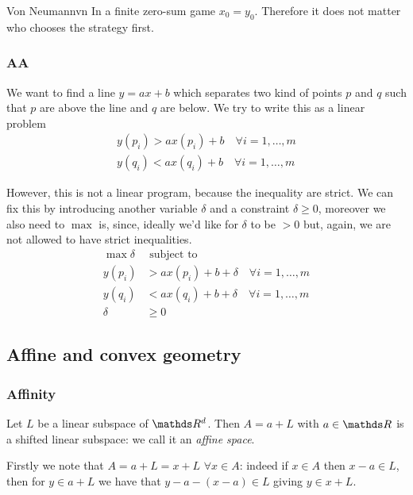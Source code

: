 \documentclass[12pt]{extarticle}
\begin{document}
\begin{theorem}{Von Neumann}{vn}
	In a finite zero-sum game $x_0 = y_0$.
	Therefore it does not matter who chooses the strategy first.
\end{theorem}


\subsubsection{AA}

We want to find a line $y = ax + b$ which separates two kind of points $p$ and $q$
such that $p$ are above the line and $q$ are below.
We try to write this as a linear problem
\begin{align}
	y(p_i) > ax(p_i) + b \quad \forall i = 1, \dots, m \\
	y(q_i) < ax(q_i) + b \quad \forall i = 1, \dots, m
\end{align}

However, this is not a linear program, because the inequality are strict.
We can fix this by introducing another variable $\delta$ and a constraint $\delta \geq 0$,
moreover we also need to $\max$ is, since, ideally we'd like for $\delta$ to be $> 0$ but, again,
we are not allowed to have strict inequalities.
\begin{align}
	\max \delta & \text{ subject to}                                   \\
	y(p_i)      & > ax(p_i) + b + \delta \quad \forall i = 1, \dots, m \\
	y(q_i)      & < ax(q_i) + b + \delta \quad \forall i = 1, \dots, m \\
	\delta      & \geq 0
\end{align}

\subsection{Affine and convex geometry}
\subsubsection{Affinity}

Let $L$ be a linear subspace of $\R^d$.
Then $A = a + L$ with $a \in \R$ is a shifted linear subspace: we call it an \emph{affine space}.

Firstly we note that $A = a + L = x + L$ $\forall x \in A$: indeed if $x \in A$ then $x-a \in L$,
then for $y \in a + L$ we have that $y - a - (x - a) \in L$ giving $y \in x + L$.
\end{document}
